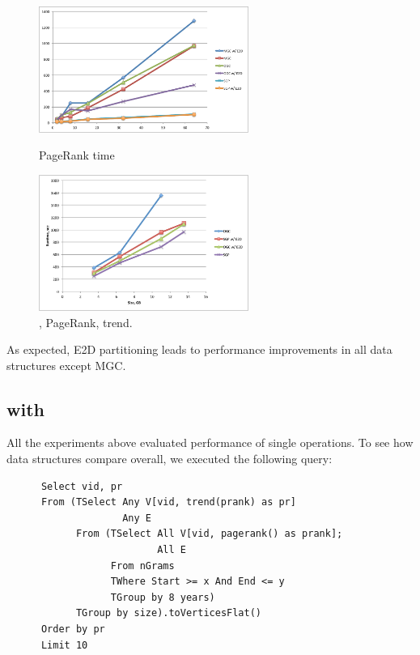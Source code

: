 \begin{figure}[t]
\centering
\begin{minipage}{3in}
  \centering
  \includegraphics[width=2.7in]{figs/pagerank.pdf}
  \vspace{-0.1in}
  \caption{PageRank time}
  \label{fig:pagerank}
  \vspace{-0.1in}
\end{minipage}
\begin{minipage}{3in}
  \centering
\includegraphics[width=2.7in]{figs/complexq.pdf}
  \vspace{-0.1in}
\caption{, PageRank, trend.}
\label{fig:complexq}
  \vspace{-0.1in}
\end{minipage}
\end{figure}

As expected, E2D partitioning leads to performance improvements in all
data structures except MGC.

\subsection{ with }

All the experiments above evaluated performance of single operations.
To see how data structures compare overall, we executed the following
query:

\begin{small}
\begin{verbatim}
      Select vid, pr
      From (TSelect Any V[vid, trend(prank) as pr]
                    Any E
            From (TSelect All V[vid, pagerank() as prank]; 
                          All E
                  From nGrams
                  TWhere Start >= x And End <= y
                  TGroup by 8 years)
            TGroup by size).toVerticesFlat()
      Order by pr
      Limit 10
\end{verbatim}
\end{small}

